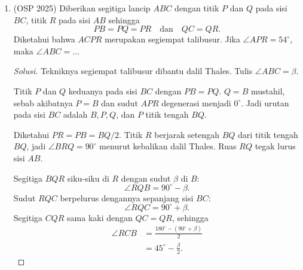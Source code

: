 \documentclass[12pt]{scrartcl}
\begin{document}
\begin{enumerate}[resume]
	\item (OSP 2025)
	Diberikan segitiga lancip $ABC$ dengan titik $P$ dan $Q$ pada sisi
	$BC$, titik $R$ pada sisi $AB$ sehingga
	\[ PB=PQ=PR \quad \text{dan} \quad QC=QR. \]
	Diketahui bahwa $ACPR$ merupakan segiempat talibusur. Jika
	$\angle APR=54^\circ$, maka $\angle ABC=\dots$
\begin{center}
\end{center}
	\begin{proof}[Solusi]
	Tekniknya segiempat talibusur dibantu dalil Thales. Tulis
	$\angle ABC = \beta$.

	Titik $P$ dan $Q$ keduanya pada sisi $BC$ dengan $PB = PQ$.
	$Q = B$ mustahil, sebab akibatnya $P = B$ dan sudut $APR$
	degenerasi menjadi $0^\circ$. Jadi urutan pada sisi $BC$ adalah
	$B, P, Q$, dan $P$ titik tengah $BQ$.

	Diketahui $PR = PB = BQ/2$. Titik $R$ berjarak setengah $BQ$
	dari titik tengah $BQ$, jadi $\angle BRQ = 90^\circ$ menurut
	kebalikan dalil Thales. Ruas $RQ$ tegak lurus sisi $AB$.

	Segitiga $BQR$ siku-siku di $R$ dengan sudut $\beta$ di $B$:
	\[ \angle RQB = 90^\circ - \beta. \]
	Sudut $RQC$ berpelurus dengannya sepanjang sisi $BC$:
	\[ \angle RQC = 90^\circ + \beta. \]
	Segitiga $CQR$ sama kaki dengan $QC = QR$, sehingga
	\begin{align*}
	\angle RCB &= \frac{180^\circ - (90^\circ + \beta)}{2} \\
	&= 45^\circ - \frac{\beta}{2}.
	\end{align*}


\end{proof}
\end{enumerate}
\end{document}

